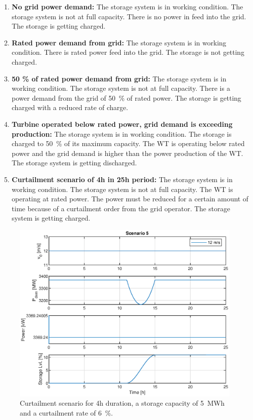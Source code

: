\begin{enumerate}
	\item \textbf{No grid power demand:}
	The storage system is in working condition.
	The storage system is not at full capacity.
	There is no power in feed into the grid.
	The storage is getting charged.
	
	\item \textbf{Rated power demand from grid:}
	The storage system is in working condition.
	There is rated power feed into the grid.
	The storage is not getting charged.
	
	\item \textbf{50 \% of rated power demand from grid:}
	The storage system is in working condition.
	The storage system is not at full capacity.
	There is a power demand from the grid of \SI{50}{\%} of rated power.
	The storage is getting charged with a reduced rate of charge.
	
	\item \textbf{Turbine operated below rated power, grid demand is exceeding production:}
	The storage system is in working condition.
	The storage is charged to \SI{50}{\%} of its maximum capacity.
	The WT is operating below rated power and the grid demand is higher than the power production of the WT.
	The storage system is getting discharged.
	
	\item \textbf{Curtailment scenario of 4h in 25h period:}
	The storage system is in working condition.
	The storage system is not at full capacity.
	The WT is operating at rated power.
	The power must be reduced for a certain amount of time because of a curtailment order from the grid operator.
	The storage system is getting charged.
\end{enumerate}

\begin{figure}[tbh]
	\centering	
	\includegraphics[width=12cm]{Figures/StorageDummyCurtailmentScenario.eps}
	\caption{Curtailment scenario for 4h duration, a storage capacity of \SI{5}{MWh} and a curtailment rate of \SI{6}{\%}.}
	\label{fig:curtailment scenario}
\end{figure} 
